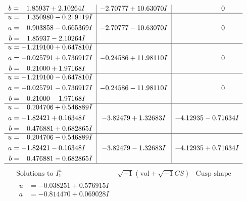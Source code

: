 \documentclass[1p]{elsarticle_modified}
\theoremstyle{definition}
\newcommand{\I}{\sqrt{-1}}
\begin{document}
$$\begin{array}{c|c|c}
\begin{aligned}
b &= \phantom{-}1.85937 + 2.10264 I\end{aligned}
 & -2.70777 + 10.63070 I & \phantom{-0.000000 } 0 \\ \hline\begin{aligned}
u &= \phantom{-}1.350980 - 0.219119 I \\
a &= \phantom{-}0.903858 - 0.665369 I \\
b &= \phantom{-}1.85937 - 2.10264 I\end{aligned}
 & -2.70777 - 10.63070 I & \phantom{-0.000000 } 0 \\ \hline\begin{aligned}
u &= -1.219100 + 0.647810 I \\
a &= -0.025791 + 0.736917 I \\
b &= \phantom{-}0.21000 + 1.97168 I\end{aligned}
 & -0.24586 + 11.98110 I & \phantom{-0.000000 } 0 \\ \hline\begin{aligned}
u &= -1.219100 - 0.647810 I \\
a &= -0.025791 - 0.736917 I \\
b &= \phantom{-}0.21000 - 1.97168 I\end{aligned}
 & -0.24586 - 11.98110 I & \phantom{-0.000000 } 0 \\ \hline\begin{aligned}
u &= \phantom{-}0.204706 + 0.546889 I \\
a &= -1.82421 + 0.16348 I \\
b &= \phantom{-}0.476881 + 0.682865 I\end{aligned}
 & -3.82479 + 1.32683 I & -4.12935 - 0.71634 I \\ \hline\begin{aligned}
u &= \phantom{-}0.204706 - 0.546889 I \\
a &= -1.82421 - 0.16348 I \\
b &= \phantom{-}0.476881 - 0.682865 I\end{aligned}
 & -3.82479 - 1.32683 I & -4.12935 + 0.71634 I\\
 \hline 
 \end{array}$$\newpage$$\begin{array}{c|c|c}  
\text{Solutions to }I^u_{1}& \I (\text{vol} + \sqrt{-1}CS) & \text{Cusp shape}\\
 \hline 
\begin{aligned}
u &= -0.038251 + 0.576915 I \\
a &= -0.814470 + 0.069028 I \\

\end{aligned}
\end{array}$$
\end{document}
